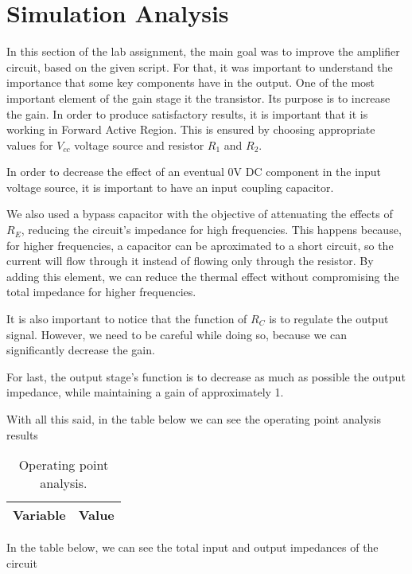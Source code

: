\section{Simulation Analysis}
\label{sec:simulation}

In this section of the lab assignment, the main goal was to improve the amplifier circuit, based on the given script. For that, it was important to understand the importance that some key components have in the output. One of the most important element of the gain stage it the transistor. Its purpose is to increase the gain. In order to produce satisfactory results, it is important that it is working in Forward Active Region. This is ensured by choosing appropriate values for $V_{cc}$ voltage source and resistor $R_1$ and $R_2$.
\par
In order to decrease the effect of an eventual 0V DC component in the input voltage source, it is important to have an input coupling capacitor.
\par
We also used a bypass capacitor with the objective of attenuating the effects of $R_E$, reducing the circuit's impedance for high frequencies. This happens because, for higher frequencies, a capacitor can be aproximated to a short circuit, so the current will flow through it instead of flowing only through the resistor. By adding this element, we can reduce the thermal effect without compromising the total impedance for higher frequencies.
\par
It is also important to notice that the function of $R_C$ is to regulate the output signal. However, we need to be careful while doing so, because we can significantly decrease the gain.
\par
For last, the output stage's function is to decrease as much as possible the output impedance, while maintaining a gain of approximately 1.
\par
With all this said, in the table below we can see the operating point analysis results

\begin{table}[H]
  \centering
  \begin{tabular}{|l|r|}
    \hline    
    {\bf Variable} & {\bf Value} \\ \hline
    
  \end{tabular}
  \caption{Operating point analysis.}
\end{table}

In the table below, we can see the total input and output impedances of the circuit

